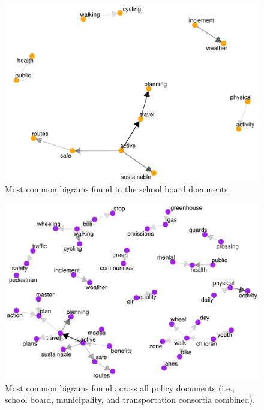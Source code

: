 \documentclass[]{elsarticle} %
\begin{document}
\begin{figure}

{\centering \includegraphics[width=1\linewidth]{AST-Framing-Ontario_files/figure-latex/school-visual-1} 

}

\caption{Most common bigrams found in the school board documents.}\label{fig:school-visual}
\end{figure}

\begin{figure}

{\centering \includegraphics[width=1\linewidth]{AST-Framing-Ontario_files/figure-latex/policy-visual-1} 

}

\caption{Most common bigrams found across all policy documents (i.e., school board, municipality, and transportation consortia combined).}\label{fig:policy-visual}
\end{figure}
\end{document}
